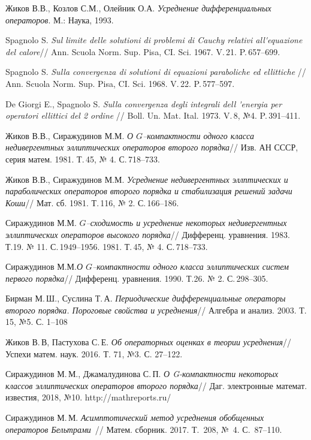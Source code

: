 \begin{thebibliography}{111}


Жиков В.В., Козлов С.М., Олейник О.А. \emph{Усреднение дифференциальных
операторов}. М.: Наука, 1993.

Spagnolo S. \emph{Sul limite delle solutioni di problemi di Cauchy
relativi all\'{}equazione del calore}// Ann. Scuola Norm. Sup. Pisa, CI. Sci. 1967. V.\,21.
P.\,657--699.

Spagnolo S. \emph{Sulla convergenza di solutioni di equazioni paraboliche ed ellittiche
} // Ann. Scuola Norm. Sup. Pisa, CI. Sci. 1968. V.\,22.
P.\,577--597.

De Giorgi E., Spagnolo S. \emph{Sulla convergenza degli integrali dell \'{}energia
per operatori ellittici del 2 ordine} // Boll. Un. Mat. Ital. 1973. V.\,8, №4. P.\,391--411.

Жиков В.В., Сиражудинов М.М. \emph{О $G$--компактности одного класса недивергентных
эллиптических операторов второго порядка}// Изв. АН СССР, серия матем.
1981. Т.\,45, № 4. С.\,718--733.

Жиков В.В., Сиражудинов М.М. \emph{Усреднение недивергентных эллптических и
параболических операторов второго порядка и стабилизация решений задачи Коши}//
Мат. сб. 1981. Т.\,116, № 2. С.\,166--186.

Сиражудинов М.М. \emph{$G$--сходимость и усреднение некоторых недивергентных
эллиптических операторов высокого порядка}// Дифференц. уравнения. 1983.
Т.19. № 11. С.\,1949--1956.
1981. Т.\,45, № 4. С.\,718--733.

Сиражудинов М.М.\emph{О $G$--компактности одного класса эллиптических систем первого
порядка}// Дифференц. уравнения. 1990. Т.26. № 2. С.\,298--305.

  Бирман М.\,Ш.,  Суслина Т.\,А.
\emph{Периодические дифференциальные операторы второго порядка.
Пороговые свойства и усреднения}//
Алгебра и анализ. 2003. Т. 15, №5. С. 1--108


  Жиков В.\,В,  Пастухова С.\,Е.
 \emph{Об операторных оценках в теории усреднения}//
Успехи матем. наук. 2016. Т. 71, №3. С. 27--122.


Сиражудинов М.\,М., Джамалудинова С.\,П. \emph{О G-компактности некоторых классов эллиптических операторов второго порядка}// Даг. электронные математ. известия, 2018, №10.  http://mathreports.ru/

 Сиражудинов М.\,М. \emph{ Асимптотический метод усреднения обобщенных операторов Бельтрами}~//  Матем. сборник. 2017. Т.~208, №~4. С.~87–110.


\end{thebibliography}
